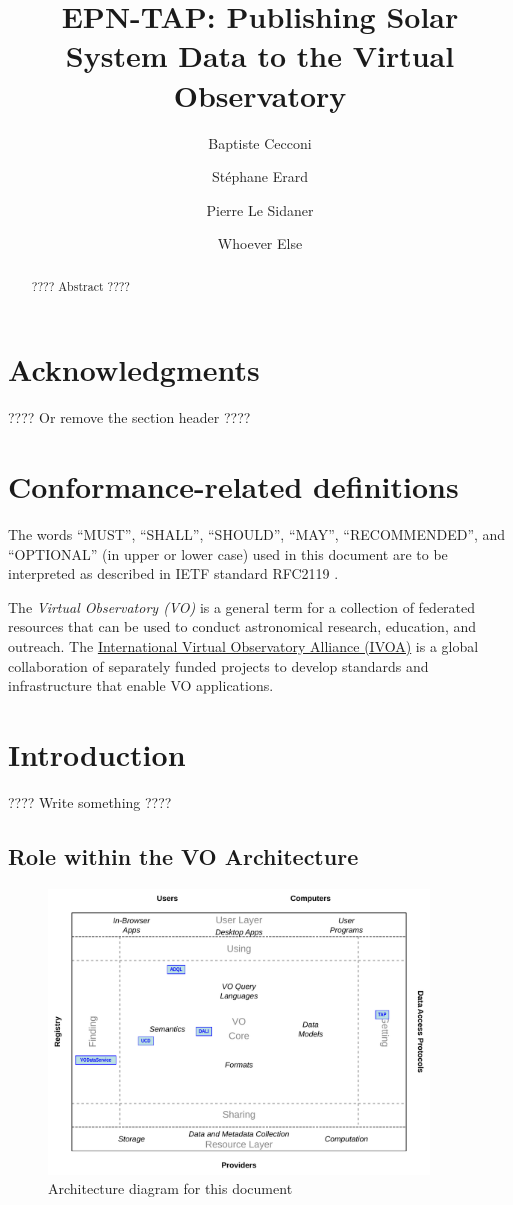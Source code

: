\documentclass[11pt,a4paper]{ivoa}
\title{EPN-TAP: Publishing Solar System Data to the Virtual Observatory}
\author{Baptiste Cecconi}
\author{Stéphane Erard}
\author{Pierre Le Sidaner}
\author{Whoever Else}
\begin{document}
\begin{abstract}
???? Abstract ????
\end{abstract}


\section*{Acknowledgments}

???? Or remove the section header ????

\section*{Conformance-related definitions}

The words ``MUST'', ``SHALL'', ``SHOULD'', ``MAY'', ``RECOMMENDED'', and
``OPTIONAL'' (in upper or lower case) used in this document are to be
interpreted as described in IETF standard RFC2119 \citep{std:RFC2119}.

The \emph{Virtual Observatory (VO)} is a
general term for a collection of federated resources that can be used
to conduct astronomical research, education, and outreach.
The \href{http://www.ivoa.net}{International
Virtual Observatory Alliance (IVOA)} is a global
collaboration of separately funded projects to develop standards and
infrastructure that enable VO applications.


\section{Introduction}

???? Write something ????

\subsection{Role within the VO Architecture}

\begin{figure}[thb]
\centering

\includegraphics[width=0.9\textwidth]{role_diagram.pdf}
\caption{Architecture diagram for this document}
\label{fig:archdiag}
\end{figure}
\end{document}
